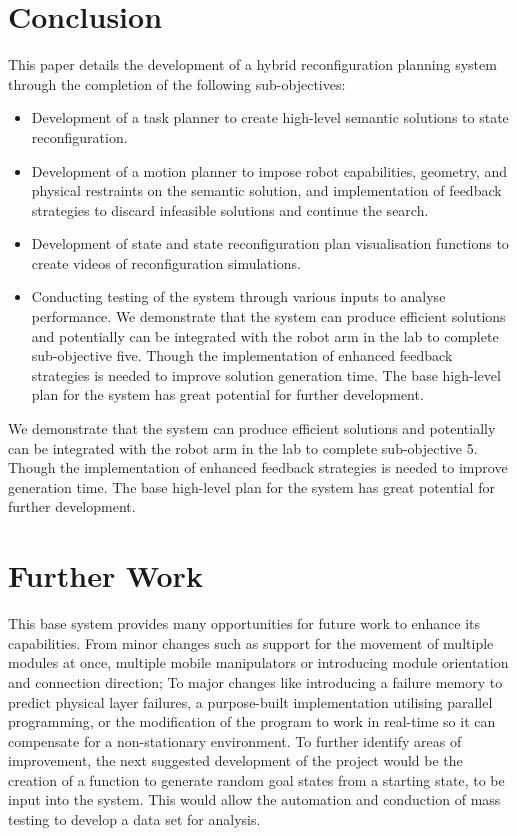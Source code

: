 \section{Conclusion}
This paper details the development of a hybrid reconfiguration planning system through the completion of the following sub-objectives:
\begin{itemize}[]
	\item Development of a task planner to create high-level semantic solutions to state reconfiguration.
	\item Development of a motion planner to impose robot capabilities, geometry, and physical restraints on the semantic solution, and implementation of feedback strategies to discard infeasible solutions and continue the search.
	\item Development of state and state reconfiguration plan visualisation functions to create videos of reconfiguration simulations.
	\item Conducting testing of the system through various inputs to analyse performance.
We demonstrate that the system can produce efficient solutions and potentially can be integrated with the robot arm in the lab to complete sub-objective five. Though the implementation of enhanced feedback strategies is needed to improve solution generation time. The base high-level plan for the system has great potential for further development.
\end{itemize}
We demonstrate that the system can produce efficient solutions and potentially can be integrated with the robot arm in the lab to complete sub-objective 5. Though the implementation of enhanced feedback strategies is needed to improve generation time. The base high-level plan for the system has great potential for further development.


\section{Further Work}
This base system provides many opportunities for future work to enhance its capabilities. From minor changes such as support for the movement of multiple modules at once, multiple mobile manipulators or introducing module orientation and connection direction; To major changes like introducing a failure memory to predict physical layer failures, a purpose-built implementation utilising parallel programming, or the modification of the program to work in real-time so it can compensate for a non-stationary environment. To further identify areas of improvement, the next suggested development of the project would be the creation of a function to generate random goal states from a starting state, to be input into the system. This would allow the automation and conduction of mass testing to develop a data set for analysis.